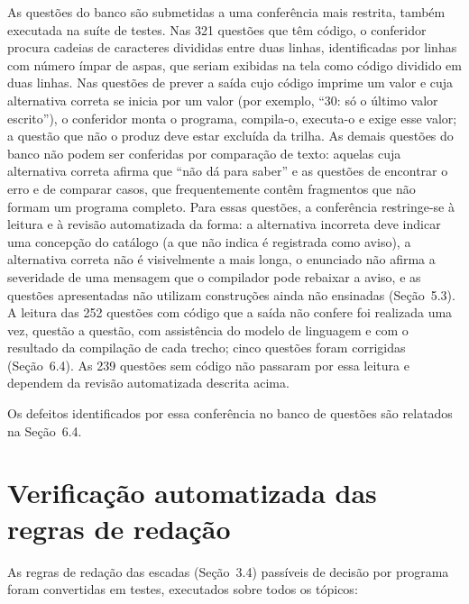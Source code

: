 As questões do banco são submetidas a uma conferência mais restrita, também executada na suíte de testes. Nas 321 questões que têm código, o conferidor procura cadeias de caracteres divididas entre duas linhas, identificadas por linhas com número ímpar de aspas, que seriam exibidas na tela como código dividido em duas linhas. Nas questões de prever a saída cujo código imprime um valor e cuja alternativa correta se inicia por um valor (por exemplo, ``30: só o último valor escrito''), o conferidor monta o programa, compila-o, executa-o e exige esse valor; a questão que não o produz deve estar excluída da trilha. As demais questões do banco não podem ser conferidas por comparação de texto: aquelas cuja alternativa correta afirma que ``não dá para saber'' e as questões de encontrar o erro e de comparar casos, que frequentemente contêm fragmentos que não formam um programa completo. Para essas questões, a conferência restringe-se à leitura e à revisão automatizada da forma: a alternativa incorreta deve indicar uma concepção do catálogo (a que não indica é registrada como aviso), a alternativa correta não é visivelmente a mais longa, o enunciado não afirma a severidade de uma mensagem que o compilador pode rebaixar a aviso, e as questões apresentadas não utilizam construções ainda não ensinadas (Seção~5.3). A leitura das 252 questões com código que a saída não confere foi realizada uma vez, questão a questão, com assistência do modelo de linguagem e com o resultado da compilação de cada trecho; cinco questões foram corrigidas (Seção~6.4). As 239 questões sem código não passaram por essa leitura e dependem da revisão automatizada descrita acima.

Os defeitos identificados por essa conferência no banco de questões são relatados na Seção~6.4.

\section{Verificação automatizada das regras de redação}

As regras de redação das escadas (Seção~3.4) passíveis de decisão por programa foram convertidas em testes, executados sobre todos os tópicos:


